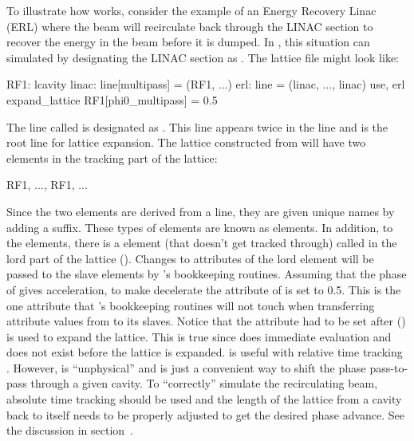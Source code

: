 To illustrate how  works, consider the example of an Energy Recovery Linac (ERL) where
the beam will recirculate back through the LINAC section to recover the energy in the beam before it
is dumped. In \bmad, this situation can simulated by designating the LINAC section as .
The lattice file might look like:
\begin{example}
  RF1: lcavity
  linac: line[multipass] = (RF1, ...)
  erl: line = (linac, ..., linac)
  use, erl
  expand_lattice
  RF1[phi0_multipass] = 0.5
\end{example}
The line called  is designated as . This  line appears twice in
the line  and  is the root line for lattice expansion. The lattice constructed from
 will have two  elements in the tracking part of the lattice:
\begin{example}
  RF1, ..., RF1, ...
\end{example}
Since the two elements are derived from a  line, they are given unique names by adding
a  suffix. These types of elements are known as  elements. In
addition, to the  elements, there is a  element (that doesn't
get tracked through) called  in the lord part of the lattice ().  Changes
to attributes of the lord  element will be passed to the slave elements by \bmad's
bookkeeping routines. Assuming that the phase of  gives acceleration, to make 
decelerate the  attribute of  is set to 0.5. This is the one attribute
that \bmad's bookkeeping routines will not touch when transferring attribute values from  to
its slaves. Notice that the  attribute had to be set after 
() is used to expand the lattice. This is true since \bmad does immediate evaluation and
 does not exist before the lattice is expanded.  is useful with
relative time tracking . However,  is ``unphysical'' and is just
a convenient way to shift the phase pass-to-pass through a given cavity. To ``correctly'' simulate
the recirculating beam, absolute time tracking should be used and the length of the lattice from a
cavity back to itself needs to be properly adjusted to get the desired phase advance. See the discussion
in section~.

